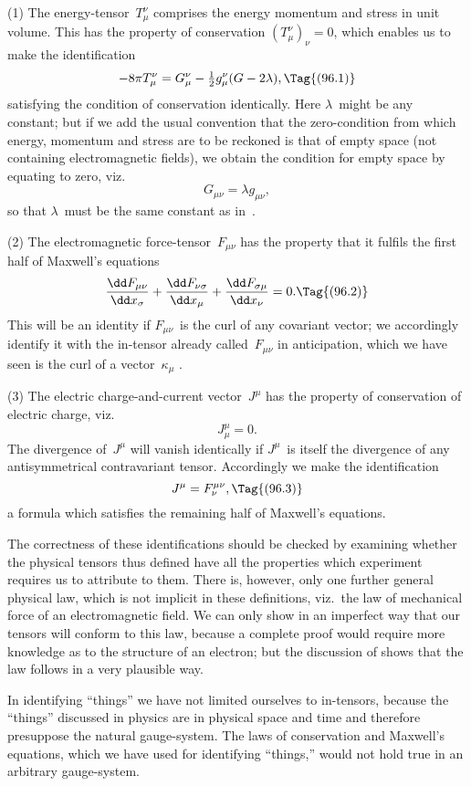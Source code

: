 \documentclass[12pt]{book}
\begin{document}
(1) The energy-tensor~$T_{\mu}^{\nu}$ comprises the energy momentum and stress in
unit volume. This has the property of conservation $(T_{\mu}^{\nu})_{\nu} = 0$, which enables
us to make the identification
\[
-8\pi T_{\mu}^{\nu} = G_{\mu}^{\nu} - \tfrac{1}{2} g_{\mu}^{\nu}(G - 2\lambda),
\Tag{(96.1)}
\]
satisfying the condition of conservation identically. Here $\lambda$~might be any
constant; but if we add the usual convention that the zero-condition from
which energy, momentum and stress are to be reckoned is that of empty space
(not containing electromagnetic fields), we obtain the condition for empty
space by equating  to zero, viz.\
\[
G_{\mu\nu} = \lambda g_{\mu\nu},
\]
so that $\lambda$~must be the same constant as in~.

(2) The electromagnetic force-tensor~$F_{\mu\nu}$ has the property that it fulfils
the first half of Maxwell's equations
\[
\frac{\dd F_{\mu\nu}}{\dd x_{\sigma}}
+ \frac{\dd F_{\nu\sigma}}{\dd x_{\mu}}
+ \frac{\dd F_{\sigma\mu}}{\dd x_{\nu}} = 0.
\Tag{(96.2)}
\]
This will be an identity if $F_{\mu\nu}$~is the curl of any covariant vector; we
accordingly identify it with the in-tensor already called~$F_{\mu\nu}$ in anticipation,
which we have seen is the curl of a vector~$\kappa_{\mu}$ \Eq{(94.62)}.

(3) The electric charge-and-current vector~$J^{\mu}$ has the property of conservation
of electric charge, viz.\
\[
J_{\mu}^{\mu} = 0.
\]
The divergence of~$J^{\mu}$ will vanish identically if $J^{\mu}$~is itself the divergence of any
antisymmetrical contravariant tensor. Accordingly we make the identification
\[
J^{\mu} = F_{\nu}^{\mu\nu},
\Tag{(96.3)}
\]
a formula which satisfies the remaining half of Maxwell's equations.

The correctness of these identifications should be checked by examining
whether the physical tensors thus defined have all the properties which
experiment requires us to attribute to them. There is, however, only one
further general physical law, which is not implicit in these definitions, viz.\ the
law of mechanical force of an electromagnetic field. We can only show in an
imperfect way that our tensors will conform to this law, because a complete
proof would require more knowledge as to the structure of an electron; but
the discussion of \SecRef{80} shows that the law follows in a very plausible way.

In identifying ``things'' we have not limited ourselves to in-tensors,
because the ``things'' discussed in physics are in physical space and time and
therefore presuppose the natural gauge-system. The laws of conservation and
Maxwell's equations, which we have used for identifying ``things,'' would not
hold true in an arbitrary gauge-system.
\end{document}
